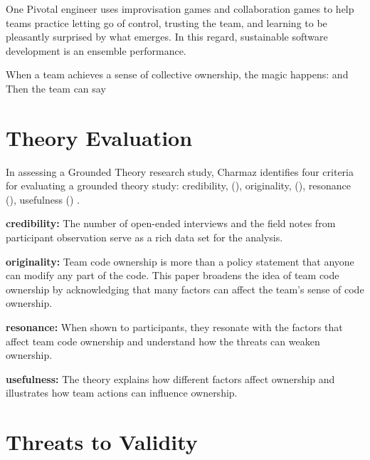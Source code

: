 
One Pivotal engineer uses improvisation games and collaboration games to help teams practice letting go of control, trusting the team, and learning to be pleasantly surprised by what emerges. In this regard, sustainable software development is an ensemble performance. 

When a team achieves a sense of collective ownership, the magic happens:  and  Then the team can say 

\section{Theory Evaluation}
\label{TheoryEvaluation}

In assessing a Grounded Theory research study, Charmaz identifies four criteria for evaluating a grounded theory study: credibility, (), originality, (), resonance (), usefulness () \cite{StolGTinSE}. 

\textbf{credibility:}  The number of open-ended interviews and the field notes from participant observation serve as a rich data set for the analysis. 

\textbf{originality:} Team code ownership is more than a policy statement that anyone can modify any part of the code. This paper broadens the idea of team code ownership by acknowledging that many factors can affect the team's sense of code ownership.

\textbf{resonance:} When shown to participants, they resonate with the factors that affect team code ownership and understand how the threats can weaken ownership.

\textbf{usefulness:} 
The theory explains how different factors affect ownership and illustrates how team actions can influence ownership. 

\section{Threats to Validity}

